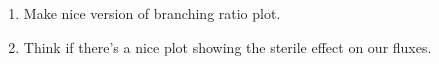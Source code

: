 \documentclass[11pt, a4paper]{article}
\def\muboone{MicroBooNE}
\newcommand{\newtext}[2]{\textcolor{#1}{\ul{#2}}}
\begin{document}
\begin{enumerate}
\item Make nice version of branching ratio plot. 

\item Think if there's a nice plot showing the sterile effect on our fluxes.


%


	\end{enumerate}



	




{}
\end{document}
